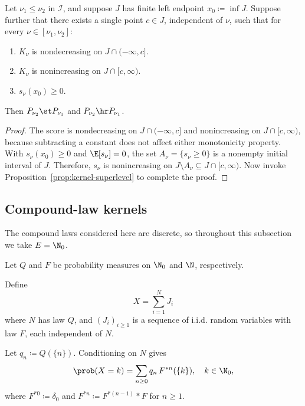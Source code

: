 \documentclass[11pt]{article}
\begin{document}
\begin{cor}
\label{cor:unimodal-kernel}
Let \(\nu_1\le\nu_2\) in \(\mathcal I\), and suppose \(J\) has finite left endpoint \(x_0\coloneqq \inf J\). Suppose further that there exists a single point \(c\in J\), independent of \(\nu\), such that for every \(\nu\in[\nu_1,\nu_2]\):
\begin{enumerate}[label=\textup{(\roman*)}]
  \item \(K_\nu\) is nondecreasing on \(J\cap(-\infty,c]\).
  \item \(K_\nu\) is nonincreasing on \(J\cap[c,\infty)\).
  \item \(s_\nu(x_0)\ge 0\).
\end{enumerate}
Then \(P_{\nu_2}\st P_{\nu_1}\) and \(P_{\nu_2}\hr P_{\nu_1}\).
\end{cor}

\begin{proof}
The score is nondecreasing on \(J\cap(-\infty,c]\) and nonincreasing on \(J\cap[c,\infty)\), because subtracting a constant does not affect either monotonicity property. With \(s_\nu(x_0)\ge 0\) and \(\E[s_\nu]=0\), the set \(A_\nu=\{s_\nu\ge 0\}\) is a nonempty initial interval of \(J\). Therefore, \(s_\nu\) is nonincreasing on \(J\setminus A_\nu\subseteq J\cap[c,\infty)\). Now invoke Proposition~\ref{prop:kernel-superlevel} to complete the proof. 
\end{proof}






\subsection{Compound-law kernels}
\label{subsec:compound-constructions}

The compound laws considered here are discrete, so throughout this subsection we take \(E=\N_0\).
\begin{defn}
\label{def:compound}
	Let $Q$ and $F$ be probability measures on $\N_0$ and $\N$, respectively.
  
  Define
\begin{equation}
  \label{def.compound-rv}
X=\sum_{i=1}^N J_i
\end{equation}
	where $N$ has law $Q$, and $(J_i)_{i\ge 1}$ is a sequence of i.i.d. random variables with law $F$, each independent of $N$. 
  
  Let $q_n \coloneqq Q(\{n\})$.  Conditioning on $N$ gives
	\[
	\prob(X=k)=\sum_{n\ge0} q_n\,F^{*n}(\{k\}), \quad k\in\N_0, 
	\]
where \(F^{*0}\coloneqq \delta_0\) and \(F^{*n}\coloneqq F^{*(n-1)}*F\) for \(n\ge1\).
\end{defn}
\end{document}
